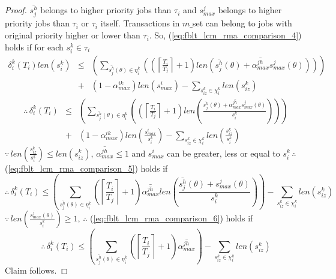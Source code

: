 \documentclass[12pt,english]{report}
\newtheorem{proof}{Proof}
\begin{document}
\begin{proof}
$\bar{s_{j}^{h}}$ belongs to higher priority jobs than $\tau_{i}$
and $s_{max}^{j}$ belongs to higher priority jobs than $\tau_{i}$
or $\tau_{i}$ itself. Transactions in $m\_$set can belong to jobs
with original priority higher or lower than $\tau_{i}$. So, (\ref{eq:fblt_lcm_rma_comparison_4})
holds if for each $s_{i}^{k}\in\tau_{i}$ 
\begin{eqnarray*}
\delta_{i}^{k}(T_{i})len(s_{i}^{k}) & \le & \left(\sum_{\bar{s_{j}^{h}}(\theta)\in\eta_{i}^{k}}\left(\left(\left\lceil \frac{T_{i}}{T_{j}}\right\rceil +1\right)len\left(\bar{s_{j}^{h}}(\theta)+\bar{\alpha_{max}^{jh}}s_{max}^{j}(\theta)\right)\right)\right)\\
 & + & \left(1-\alpha_{max}^{ik}\right)len(s_{max}^{i})-\sum_{s_{iz}^{k}\in\chi_{i}^{k}}len(s_{iz}^{k})
\end{eqnarray*}
\begin{eqnarray}
\therefore\,\delta_{i}^{k}(T_{i}) & \le & \left(\sum_{\bar{s_{j}^{h}}(\theta)\in\eta_{i}^{k}}\left(\left(\left\lceil \frac{T_{i}}{T_{j}}\right\rceil +1\right)len\left(\frac{\bar{s_{j}^{h}}(\theta)+\bar{\alpha_{max}^{jh}}s_{max}^{j}(\theta)}{s_{i}^{k}}\right)\right)\right)\nonumber \\
 & + & \left(1-\alpha_{max}^{ik}\right)len(\frac{s_{max}^{i}}{s_{i}^{k}})-\sum_{s_{iz}^{k}\in\chi_{i}^{k}}len\left(\frac{s_{iz}^{k}}{s_{i}^{k}}\right)\label{eq:fblt_lcm_rma_comparison_5}
\end{eqnarray}
$\because\, len\left(\frac{s_{iz}^{k}}{s_{i}^{k}}\right)\le len(s_{iz}^{k})$,
$\bar{\alpha_{max}^{jh}}\le1$ and $s_{max}^{i}$ can be greater,
less or equal to $s_{i}^{k}\,\therefore$ (\ref{eq:fblt_lcm_rma_comparison_5})
holds if 
\begin{equation}
\therefore\,\delta_{i}^{k}(T_{i})\le\left(\sum_{\bar{s_{j}^{h}}(\theta)\in\eta_{i}^{k}}\left(\left\lceil \frac{T_{i}}{T_{j}}\right\rceil +1\right)\bar{\alpha_{max}^{jh}}len\left(\frac{\bar{s_{j}^{h}}(\theta)+s_{max}^{j}(\theta)}{s_{i}^{k}}\right)\right)-\sum_{s_{iz}^{k}\in\chi_{i}^{k}}len\left(s_{iz}^{k}\right)\label{eq:fblt_lcm_rma_comparison_6}
\end{equation}
$\because\, len(\frac{s_{max}^{j}(\theta)}{s_{i}^{k}})\ge1,\,\therefore$
(\ref{eq:fblt_lcm_rma_comparison_6}) holds if 
\begin{equation*}
\therefore\,\delta_{i}^{k}(T_{i})\le\left(\sum_{\bar{s_{j}^{h}}(\theta)\in\eta_{i}^{k}}\left(\left\lceil \frac{T_{i}}{T_{j}}\right\rceil +1\right)\bar{\alpha_{max}^{jh}}\right)-\sum_{s_{iz}^{k}\in\chi_{i}^{k}}len\left(s_{iz}^{k}\right)
\end{equation*}
Claim follows.

\end{proof}
\end{document}
